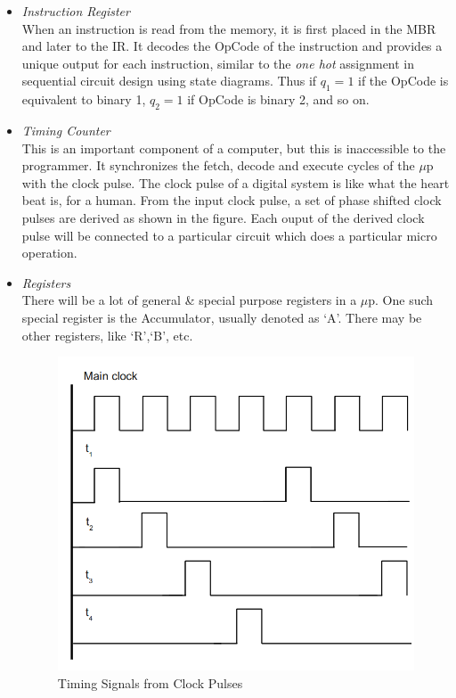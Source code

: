 \documentclass{book}
\begin{document}
\begin{itemize}
  \item\textit{Instruction Register} \\[5pt]
  When an instruction is read from the memory, it is first placed in the MBR and
later to the IR. It decodes the OpCode of the instruction and provides a unique output for each instruction, similar to the \emph{one hot} assignment in sequential circuit design using state diagrams. Thus if $q_1=1$ if the OpCode is equivalent to binary 1, $q_2=1$ if OpCode is binary 2, and so on.

  \item\textit{Timing Counter} \\[5pt]
  This is an important component of a computer, but this is inaccessible to the programmer. It synchronizes the fetch, decode and execute cycles of the $\mu$p with the clock pulse. The clock pulse of a digital system is like what the heart beat is, for a human. From the input clock pulse, a set of phase shifted clock pulses are derived as shown in the figure. Each ouput of the derived clock pulse will be connected to a particular circuit which does a particular micro operation. 



  \item\textit{Registers} \\[5pt]
  There will be a lot of general \& special purpose registers in a $\mu$p. One such special register is the Accumulator, usually denoted as \lq A\rq. There may be other registers, like \lq R\rq,\lq B\rq, etc.

\begin{figure}[h]

\begin{center}
  \includegraphics[scale=.35]{imgs/clock.png}
\end{center}
\caption{Timing Signals from Clock Pulses}
\end{figure}




\end{itemize}
\end{document}
